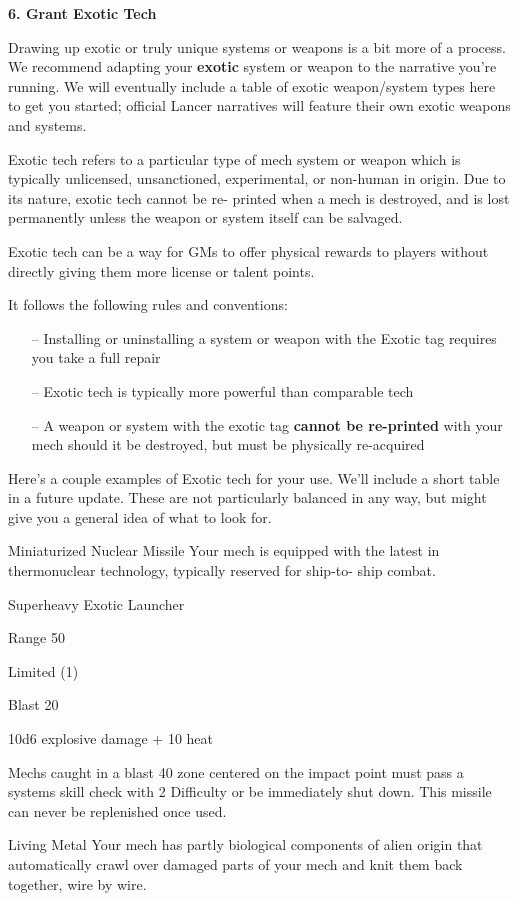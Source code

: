 \textbf{6. Grant Exotic Tech}

Drawing up exotic or truly unique systems or weapons is a bit more of a process. We
recommend adapting your \textbf{exotic} system or weapon to the narrative you’re running. We will
eventually include a table of exotic weapon/system types here to get you started; official Lancer
narratives will feature their own exotic weapons and systems.

Exotic tech refers to a particular type of mech system or weapon which is typically unlicensed,
unsanctioned, experimental, or non-human in origin. Due to its nature, exotic tech cannot be re-
printed when a mech is destroyed, and is lost permanently unless the weapon or system itself
can be salvaged.

Exotic tech can be a way for GMs to offer physical rewards to players without directly giving
them more license or talent points.

It follows the following rules and conventions:
\begin{itemize}
\item[--]Installing or uninstalling a system or weapon with the Exotic tag requires you take a full repair
\item[--]Exotic tech is typically more powerful than comparable tech
\item[--]A weapon or system with the exotic tag \textbf{cannot be re-printed} with your mech should it be destroyed, but must be physically re-acquired
\end{itemize}

Here’s a couple examples of Exotic tech for your use. We’ll include a short table in a future
update. These are not particularly balanced in any way, but might give you a general idea of what
to look for.


Miniaturized Nuclear Missile
Your mech is equipped with the latest in thermonuclear technology, typically reserved for ship-to-
ship combat.

Superheavy Exotic Launcher

Range 50

Limited (1)

Blast 20

10d6 explosive damage + 10 heat


Mechs caught in a blast 40 zone centered on the impact point must pass a systems skill check
with 2 Difficulty or be immediately shut down. This missile can never be replenished once used.


Living Metal
Your mech has partly biological components of alien origin that automatically crawl over damaged
parts of your mech and knit them back together, wire by wire.

